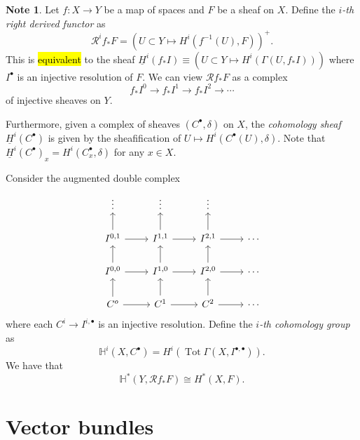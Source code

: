 \documentclass[10pt,letterpaper,cm]{nupset}
\theoremstyle{definition}
\newtheorem{note}[definition]{Note}
\theoremstyle{theorem}
\theoremstyle{remark}
\newcommand{\1}{\mathbb{1}}
\newcommand{\0}{\vec 0}
\DeclareMathOperator{\tot}{Tot}
\begin{document}
\begin{note}
Let $f : X \to Y$ be a map of spaces and $F$ be a sheaf on $X$. Define the \textit{$i$-th right derived functor} as $$\mathcal{R}^i{f_{\ast}{F}} = ( U\subset Y \mapsto H^i(f^{-1}(U), F)  )^+.$$ This is \hl{equivalent} to the sheaf $\underline{H}^i(f_{\ast}{I})\equiv (U\subset Y \mapsto H^i(\Gamma(U, f_{\ast}I)))$ where $I^{\bullet}$ is an injective resolution of $F$. We can view $\mathcal{R}f_{\ast}F$ as a complex $$f_{\ast}I^0 \to f_{\ast}I^1 \to f_{\ast}I^2 \to \cdots$$ of injective sheaves on $Y$.

Furthermore, given a complex of sheaves $(C^{\bullet}, \delta)$ on $X$, the \textit{cohomology sheaf $\underline{H}^i(C^{\bullet})  $} is given by the sheafification of $U \mapsto H^i(C^{\bullet}(U), \delta)$. Note that $\underline{H}^i(C^{\bullet})_x = H^i(C^{\bullet}_x, \delta)$ for any $x\in X$.

Consider the augmented double complex 
\[
\begin{tikzcd}
\vdots                        & \vdots                        & \vdots                        &        \\
{I^{0,1}} \arrow[u] \arrow[r] & {I^{1,1}} \arrow[u] \arrow[r] & {I^{2,1}} \arrow[u] \arrow[r] & \cdots \\
{I^{0,0}} \arrow[u] \arrow[r] & {I^{1,0}} \arrow[u] \arrow[r] & {I^{2,0}} \arrow[u] \arrow[r] & \cdots \\
C^o \arrow[u] \arrow[r]       & C^1 \arrow[u] \arrow[r]       & C^2 \arrow[u] \arrow[r]       & \cdots
\end{tikzcd}
\]
where each $C^i \to I^{i, \bullet}$ is an injective resolution. Define the \textit{$i$-th cohomology group} as $$\mathbb{H}^i(X, C^{\bullet}) = H^i(\tot{\Gamma(X, I^{\bullet, \bullet})}) .  $$ We have that $$\mathbb{H}^{\ast}(Y, \mathcal{R}f_{\ast}{F}) \cong H^{\ast}(X, F)  .$$
\end{note}

\section{Vector bundles}
\end{document}
